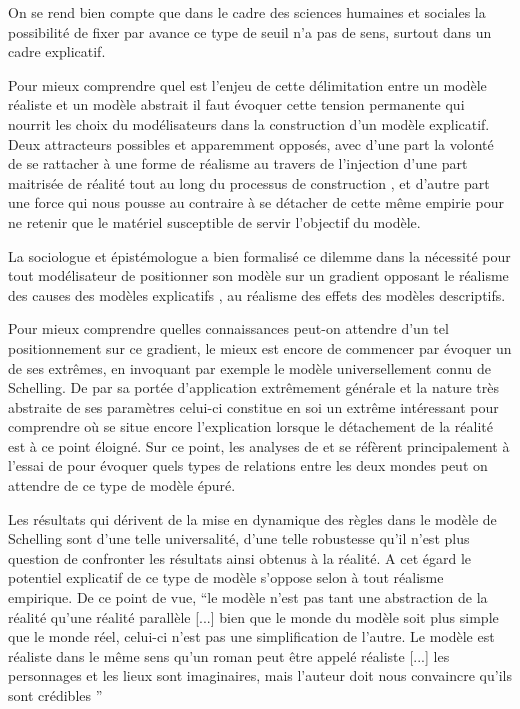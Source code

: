 On se rend bien compte que dans le cadre des sciences humaines et sociales la possibilité de fixer par avance ce type de seuil n'a pas de sens, surtout dans un cadre explicatif.


Pour mieux comprendre quel est l'enjeu de cette délimitation entre un modèle réaliste et un modèle abstrait il faut évoquer cette tension permanente qui nourrit les choix du modélisateurs dans la construction d'un modèle explicatif. Deux attracteurs possibles et apparemment opposés, avec d'une part la volonté de se rattacher à une forme de réalisme au travers de l'injection d'une part maitrisée de réalité tout au long du processus de construction , et d'autre part une force qui nous pousse au contraire à se détacher de cette même empirie pour ne retenir que le matériel susceptible de servir l'objectif du modèle.

La sociologue et épistémologue \textcite{Bulle2005} a bien formalisé ce dilemme dans la nécessité pour tout modélisateur de positionner son modèle sur un gradient opposant le réalisme des causes des modèles explicatifs , au réalisme des effets des modèles descriptifs. 

Pour mieux comprendre quelles connaissances peut-on attendre d'un tel positionnement sur ce gradient, le mieux est encore de commencer par évoquer un de ses extrêmes, en invoquant par exemple le modèle universellement connu de Schelling. De par sa portée d'application extrêmement générale et la nature très abstraite de ses paramètres celui-ci constitue en soi un extrême intéressant pour comprendre où se situe encore l'explication lorsque le détachement de la réalité est à ce point éloigné. Sur ce point, les analyses de \textcite{Bulle2005} et \textcite{Phan2008, Phan2010} se réfèrent principalement à l'essai de \textcite{Sugden2002} pour évoquer quels types de relations entre les deux mondes peut on attendre de ce type de modèle épuré. 

Les résultats qui dérivent de la mise en dynamique des règles dans le modèle de Schelling sont d'une telle universalité, d'une telle robustesse qu'il n'est plus question de confronter les résultats ainsi obtenus à la réalité. A cet égard le potentiel explicatif de ce type de modèle s'oppose selon \textcite{Bulle2005} à tout réalisme empirique. De ce point de vue, \enquote{le modèle n'est pas tant une abstraction de la réalité qu’une réalité parallèle [...] bien que le monde du modèle soit plus simple que le monde réel, celui-ci n'est pas une simplification de l'autre. Le modèle est réaliste dans le même sens qu'un roman peut être appelé réaliste [...] les personnages et les lieux sont imaginaires, mais l'auteur doit nous convaincre qu'ils sont crédibles } \autocites[131]{Sugden2002}[10]{Phan2008}

